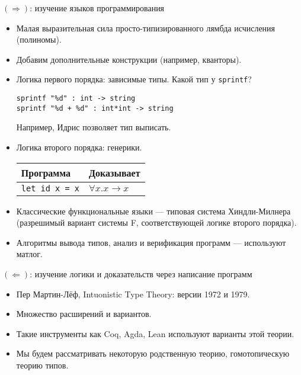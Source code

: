\documentclass[aspectratio=169]{beamer}
\begin{document}
\begin{frame}[fragile]{$(\Rightarrow)$: изучение языков программирования}
\begin{itemize}
\item Малая выразительная сила просто-типизированного лямбда исчисления (полиномы).
\item Добавим дополнительные конструкции (например, кванторы).
\item Логика первого порядка: зависимые типы.
Какой тип у \verb!sprintf!?
\begin{center}
\begin{verbatim} 
sprintf "%d" : int -> string
sprintf "%d + %d" : int*int -> string
\end{verbatim}
\end{center}

Например, Идрис позволяет тип выписать.

\item Логика второго порядка: генерики.

\begin{center}
\begin{tabular}{l|l}
Программа & Доказывает\\\hline
\verb!let id x = x! & $\forall x.x \rightarrow x$
\end{tabular}\end{center}

\item Классические функциональные языки --- типовая система Хиндли-Милнера 
(разрешимый вариант системы F, соответствующей логике второго порядка).

\item Алгоритмы вывода типов, анализ и верификация программ --- используют матлог.
\end{itemize}
\end{frame}

\begin{frame}{$(\Leftarrow)$: изучение логики и доказательств через написание программ}
\begin{itemize}
\item Пер Мартин-Лёф, Intuonistic Type Theory: версии 1972 и 1979.
\item Множество расширений и вариантов.
\item Такие инструменты как Coq, Agda, Lean используют варианты этой теории.
\item Мы будем рассматривать некоторую родственную теорию, гомотопическую теорию типов.
\end{itemize}
\end{frame}
\end{document}
